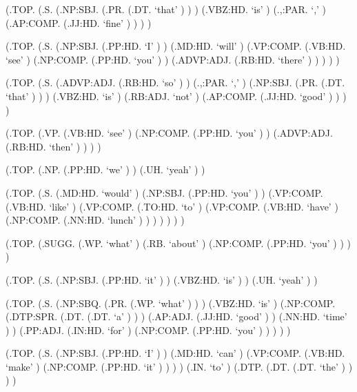 \documentclass[10pt]{article}
\begin{document}
\begin{parsetree}  (.TOP. (.S. (.NP:SBJ. (.PR. (.DT. `that' ) ) ) (.VBZ:HD. `is' ) (.,:PAR. `,' ) (.AP:COMP. (.JJ:HD. `fine' ) ) ) ) \end{parsetree}

\begin{parsetree}  (.TOP. (.S. (.NP:SBJ. (.PP:HD. `I' ) ) (.MD:HD. `will' ) (.VP:COMP. (.VB:HD. `see' ) (.NP:COMP. (.PP:HD. `you' ) ) (.ADVP:ADJ. (.RB:HD. `there' ) ) ) ) ) \end{parsetree}

\begin{parsetree}  (.TOP. (.S. (.ADVP:ADJ. (.RB:HD. `so' ) ) (.,:PAR. `,' ) (.NP:SBJ. (.PR. (.DT. `that' ) ) ) (.VBZ:HD. `is' ) (.RB:ADJ. `not' ) (.AP:COMP. (.JJ:HD. `good' ) ) ) ) \end{parsetree}

\begin{parsetree}  (.TOP. (.VP. (.VB:HD. `see' ) (.NP:COMP. (.PP:HD. `you' ) ) (.ADVP:ADJ. (.RB:HD. `then' ) ) ) ) \end{parsetree}

\begin{parsetree}  (.TOP. (.NP. (.PP:HD. `we' ) ) (.UH. `yeah' ) ) \end{parsetree}

\begin{parsetree}  (.TOP. (.S. (.MD:HD. `would' ) (.NP:SBJ. (.PP:HD. `you' ) ) (.VP:COMP. (.VB:HD. `like' ) (.VP:COMP. (.TO:HD. `to' ) (.VP:COMP. (.VB:HD. `have' ) (.NP:COMP. (.NN:HD. `lunch' ) ) ) ) ) ) ) \end{parsetree}

\begin{parsetree}  (.TOP. (.SUGG. (.WP. `what' ) (.RB. `about' ) (.NP:COMP. (.PP:HD. `you' ) ) ) ) \end{parsetree}

\begin{parsetree}  (.TOP. (.S. (.NP:SBJ. (.PP:HD. `it' ) ) (.VBZ:HD. `is' ) ) (.UH. `yeah' ) ) \end{parsetree}

\begin{parsetree}  (.TOP. (.S. (.NP:SBQ. (.PR. (.WP. `what' ) ) ) (.VBZ:HD. `is' ) (.NP:COMP. (.DTP:SPR. (.DT. (.DT. `a' ) ) ) (.AP:ADJ. (.JJ:HD. `good' ) ) (.NN:HD. `time' ) ) (.PP:ADJ. (.IN:HD. `for' ) (.NP:COMP. (.PP:HD. `you' ) ) ) ) ) \end{parsetree}

\begin{parsetree}  (.TOP. (.S. (.NP:SBJ. (.PP:HD. `I' ) ) (.MD:HD. `can' ) (.VP:COMP. (.VB:HD. `make' ) (.NP:COMP. (.PP:HD. `it' ) ) ) ) (.IN. `to' ) (.DTP. (.DT. (.DT. `the' ) ) ) ) \end{parsetree}
\end{document}

